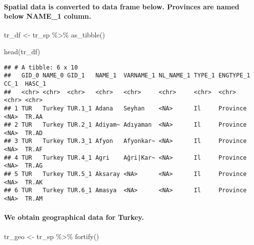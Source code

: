 \documentclass[
]{article}
\newenvironment{Shaded}{\begin{snugshade}}{\end{snugshade}}
\newcommand{\FunctionTok}[1]{\textcolor[rgb]{0.00,0.00,0.00}{#1}}
\newcommand{\NormalTok}[1]{#1}
\newcommand{\OtherTok}[1]{\textcolor[rgb]{0.56,0.35,0.01}{#1}}
\newcommand{\SpecialCharTok}[1]{\textcolor[rgb]{0.00,0.00,0.00}{#1}}
\begin{document}
\hypertarget{spatial-data-is-converted-to-data-frame-below.-provinces-are-named-below-name_1-column.}{%
\paragraph{Spatial data is converted to data frame below. Provinces are
named below NAME\_1
column.}\label{spatial-data-is-converted-to-data-frame-below.-provinces-are-named-below-name_1-column.}}

\begin{Shaded}
\begin{Highlighting}[]
\NormalTok{tr\_df }\OtherTok{\textless{}{-}}\NormalTok{ tr\_sp }\SpecialCharTok{\%\textgreater{}\%} 
          \FunctionTok{as\_tibble}\NormalTok{()}

\FunctionTok{head}\NormalTok{(tr\_df)}
\end{Highlighting}
\end{Shaded}

\begin{verbatim}
## # A tibble: 6 x 10
##   GID_0 NAME_0 GID_1   NAME_1  VARNAME_1 NL_NAME_1 TYPE_1 ENGTYPE_1 CC_1  HASC_1
##   <chr> <chr>  <chr>   <chr>   <chr>     <chr>     <chr>  <chr>     <chr> <chr> 
## 1 TUR   Turkey TUR.1_1 Adana   Seyhan    <NA>      Il     Province  <NA>  TR.AA 
## 2 TUR   Turkey TUR.2_1 Adiyam~ Adıyaman  <NA>      Il     Province  <NA>  TR.AD 
## 3 TUR   Turkey TUR.3_1 Afyon   Afyonkar~ <NA>      Il     Province  <NA>  TR.AF 
## 4 TUR   Turkey TUR.4_1 Agri    Ağri|Kar~ <NA>      Il     Province  <NA>  TR.AG 
## 5 TUR   Turkey TUR.5_1 Aksaray <NA>      <NA>      Il     Province  <NA>  TR.AK 
## 6 TUR   Turkey TUR.6_1 Amasya  <NA>      <NA>      Il     Province  <NA>  TR.AM
\end{verbatim}

\hypertarget{we-obtain-geographical-data-for-turkey.}{%
\paragraph{We obtain geographical data for
Turkey.}\label{we-obtain-geographical-data-for-turkey.}}

\begin{Shaded}
\begin{Highlighting}[]
\NormalTok{tr\_geo }\OtherTok{\textless{}{-}}\NormalTok{ tr\_sp }\SpecialCharTok{\%\textgreater{}\%} 
            \FunctionTok{fortify}\NormalTok{()}
\end{Highlighting}
\end{Shaded}
\end{document}
